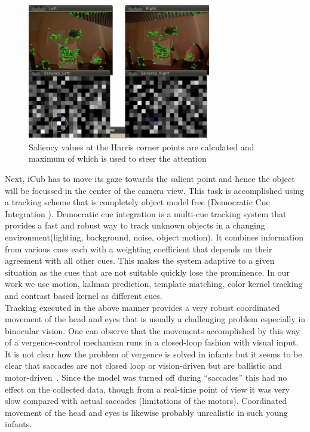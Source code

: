 \documentclass[conference]{IEEEtran}
\begin{document}
\begin{figure} [!tbp]
\centering
\includegraphics[width=8.0cm]{saliency_harris.jpg}
\caption{Saliency values at the Harris corner points are calculated and maximum of which is used to steer the attention}
\label{fig:saliency_harris}
\end{figure}
Next, iCub has to move its gaze towards the salient point and hence the object will be focussed in the center of the camera view. This task is accomplished using a tracking scheme that is completely object model free (Democratic Cue Integration \cite{triesch2001}). Democratic cue integration is a multi-cue tracking system that provides a fast and robust way to track unknown objects in a changing environment(lighting, background, noise, object motion). It combines information from various cues each with a weighting coefficient that depends on their agreement with all other cues. This makes the system adaptive to a given situation as the cues that are not suitable quickly lose the prominence. In our work we use motion, kalman prediction, template matching, color kernel tracking and contrast based kernel as different cues. \\
Tracking executed in the above manner provides a very robust coordinated movement of the head and eyes that is usually a challenging problem especially in binocular vision. One can observe that the movements accomplished by this way of a vergence-control
mechanism runs in a closed-loop fashion with visual input. It is not clear
how the problem of vergence is solved in infants but it seems to be clear that
saccades are not closed loop or vision-driven but are ballistic and
motor-driven~\cite{hainline_1998}. Since the model was turned off
during ``saccades'' this had no effect on the collected data, though
from a real-time point of view it was very slow compared with actual
saccades (limitations of the motors). Coordinated movement of the head
and eyes is likewise probably unrealistic in such young infants. \\
\end{document}
